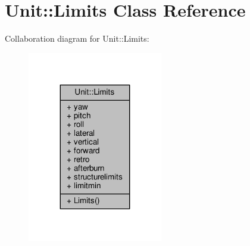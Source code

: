 \hypertarget{classUnit_1_1Limits}{}\section{Unit\+:\+:Limits Class Reference}
\label{classUnit_1_1Limits}


Collaboration diagram for Unit\+:\+:Limits\+:
\nopagebreak
\begin{figure}[H]
\begin{center}
\leavevmode
\includegraphics[width=167pt]{d4/d5b/classUnit_1_1Limits__coll__graph}
\end{center}
\end{figure}

